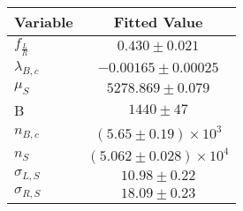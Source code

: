 \begin{tabular}[t]{lc}
\hline
Variable &Fitted Value\\
\hline\hline
$f_{\frac{L}{R}}$&$0.430\pm0.021$\\
\hline
$\lambda_{B,c}$&$-0.00165\pm0.00025$\\
\hline
$\mu_S$&$5278.869\pm0.079$\\
\hline
B&$1440\pm47$\\
\hline
$n_{B,c}$&$(5.65\pm0.19)\times 10^3$\\
\hline
$n_S$&$(5.062\pm0.028)\times 10^4$\\
\hline
$\sigma_{L, S}$&$10.98\pm0.22$\\
\hline
$\sigma_{R, S}$&$18.09\pm0.23$\\
\hline
\end{tabular}